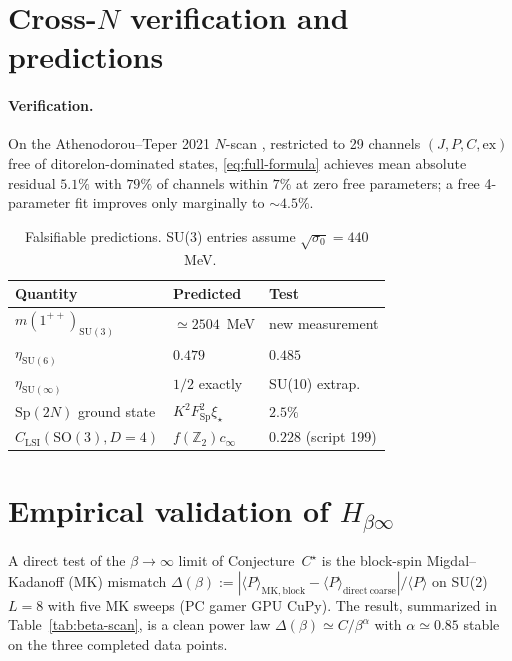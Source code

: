 \documentclass[aps,prl,reprint,superscriptaddress,floatfix,nofootinbib,amssymb]{revtex4-2}
\theoremstyle{definition}
\theoremstyle{remark}
\newcommand{\Z}{\mathbb{Z}}
\newcommand{\xistar}{\xi_{\star}}
\newcommand{\sigzero}{\sigma_0}
\newcommand{\cinf}{c_{\infty}}
\newcommand{\CLSI}{C_{\mathrm{LSI}}}
\begin{document}
\section{Cross-$N$ verification and predictions}\label{sec:verify}

\paragraph{Verification.}
On the Athenodorou--Teper 2021 $N$-scan
\cite{AthenodorouTeper2021}, restricted to 29 channels
$(J,P,C,\mathrm{ex})$ free of ditorelon-dominated states,
\eqref{eq:full-formula} achieves mean absolute residual $5.1\%$ with
$79\%$ of channels within $7\%$ at zero free parameters; a free
4-parameter fit improves only marginally to $\sim 4.5\%$.

\begin{table}[h]
\centering
\caption{Falsifiable predictions. SU(3) entries assume
$\sqrt{\sigzero}=440$~MeV.}
\label{tab:predictions}
\begin{tabular}{lll}
\toprule
Quantity & Predicted & Test \\
\midrule
$m(1^{++})_{\mathrm{SU}(3)}$ & $\simeq 2504$~MeV & new measurement \\
$\eta_{\mathrm{SU}(6)}$ & $0.479$ & $0.485$ \cite{AthenodorouTeper2021}\\
$\eta_{\mathrm{SU}(\infty)}$ & $1/2$ exactly & SU(10) extrap.\\
$\mathrm{Sp}(2N)$ ground state & $K^{2}F_{\mathrm{Sp}}^{2}\xistar$
                              & $2.5\%$ \cite{Bennett2021}\\
$\CLSI(\mathrm{SO(3)},D=4)$ & $f(\Z_{2})\cinf$ & $0.228$ (script 199)\\
\bottomrule
\end{tabular}
\end{table}

\section{Empirical validation of $H_{\beta\infty}$}\label{sec:Hbinf}

A direct test of the $\beta\to\infty$ limit of Conjecture~$C^{\star}$
is the block-spin Migdal--Kadanoff (MK) mismatch
$\Delta(\beta) := |\langle P\rangle_{\mathrm{MK,block}}
- \langle P\rangle_{\mathrm{direct~coarse}}|/\langle P\rangle$
on SU(2) $L=8$ with five MK sweeps (PC gamer GPU CuPy).
The result, summarized in Table~\ref{tab:beta-scan}, is a clean power
law $\Delta(\beta)\simeq C/\beta^{\alpha}$ with $\alpha\simeq 0.85$
stable on the three completed data points.
\end{document}
